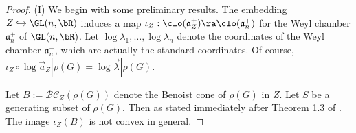 \begin{proof} 
	(I) We begin with some preliminary results.  %
%	 
	 	The embedding $Z \hookrightarrow \GL(n, \bR)$
	 induces a map $\iota_Z:\clo(\mathfrak{a}_Z^+) \ra \clo(\mathfrak{a}^+_n)$ for the Weyl chamber
	 $\mathfrak{a}^+_n$ of $\GL(n, \bR)$. 
	 Let $\log\lambda_1, \dots, \log\lambda_n$ denote the 
	 coordinates of the Weyl chamber $\mathfrak{a}^+_n$, 
which are actually the standard coordinates.
	 Of course, $\iota_Z \circ \log \vec{a}_Z| 
	 \rho(G) = \log\vec{\lambda}|\rho(G)$. 


	 	Let $B:=\mathcal{BC}_Z(\rho(G))$ denote the 
	 Benoist cone of $\rho(G)$ in $Z$. 
Let $S$ be a generating subset of $\rho(G)$. Then 
as stated immediately after Theorem 1.3 of \cite{BS2021}. 
 The image $\iota_Z(B)$ is not convex in general. 




\end{proof}
